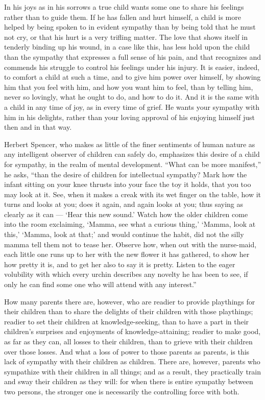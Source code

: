 \documentclass[
]{book}
\begin{document}
In his joys as in his sorrows a true child wants some one to share his feelings rather than to guide them. If he has fallen and hurt himself, a child is more helped by being spoken to in evident sympathy than by being told that he must not cry, or that his hurt is a very trifling matter. The love that shows itself in tenderly binding up his wound, in a case like this, has less hold upon the child than the sympathy that expresses a full sense of his pain, and that recognizes and commends his struggle to control his feelings under his injury. It is easier, indeed, to comfort a child at such a time, and to give him power over himself, by showing him that you feel with him, and how you want him to feel, than by telling him, never so lovingly, what he ought to do, and how to do it. And it is the same with a child in any time of joy, as in every time of grief. He wants your sympathy with him in his delights, rather than your loving approval of his enjoying himself just then and in that way.

Herbert Spencer, who makes as little of the finer sentiments of human nature as any intelligent observer of children can safely do, emphasizes this desire of a child for sympathy, in the realm of mental development. ``What can be more manifest,'' he asks, ``than the desire of children for intellectual sympathy? Mark how the infant sitting on your knee thrusts into your face the toy it holds, that you too may look at it. See, when it makes a creak with its wet finger on the table, how it turns and looks at you; does it again, and again looks at you; thus saying as clearly as it can --- `Hear this new sound.' Watch how the older children come into the room exclaiming, `Mamma, see what a curious thing,' `Mamma, look at this,' `Mamma, look at that;' and would continue the habit, did not the silly mamma tell them not to tease her. Observe how, when out with the nurse-maid, each little one runs up to her with the new flower it has gathered, to show her how pretty it is, and to get her also to say it is pretty. Listen to the eager volubility with which every urchin describes any novelty he has been to see, if only he can find some one who will attend with any interest.''

How many parents there are, however, who are readier to provide playthings for their children than to share the delights of their children with those playthings; readier to set their children at knowledge-seeking, than to have a part in their children's surprises and enjoyments of knowledge-attaining; readier to make good, as far as they can, all losses to their children, than to grieve with their children over those losses. And what a loss of power to those parents as parents, is this lack of sympathy with their children as children. There are, however, parents who sympathize with their children in all things; and as a result, they practically train and sway their children as they will: for when there is entire sympathy between two persons, the stronger one is necessarily the controlling force with both.
\end{document}
